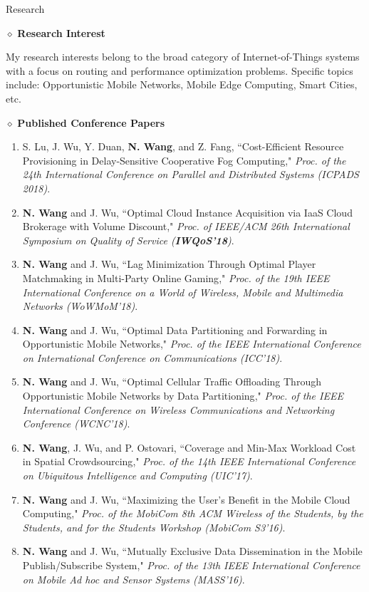 \documentclass{resume} %
\begin{document}
\begin{rSection}{Research}
\item $\diamond$ {\bf Research Interest}

My research interests belong to the broad category of Internet-of-Things systems with a focus on routing and performance optimization problems. Specific topics include: Opportunistic Mobile Networks, Mobile Edge Computing, Smart Cities, etc.

\item $\diamond$ {\bf Published Conference Papers}
\begin{enumerate}[{C}1.] \setlength{\itemsep}{-5pt}
\item S. Lu, J. Wu, Y. Duan, {\bf N. Wang}, and Z. Fang, ``Cost-Efficient Resource Provisioning in Delay-Sensitive Cooperative Fog Computing," \textit{Proc. of the 24th International Conference on Parallel and Distributed Systems (ICPADS 2018)}.
\item {\bf N. Wang} and J. Wu, ``{Optimal Cloud Instance Acquisition via IaaS Cloud Brokerage with Volume Discount}," \textit{Proc. of IEEE/ACM 26th International Symposium on Quality of Service ({\bf IWQoS'18})}.
\item {\bf N. Wang} and J. Wu, ``{Lag Minimization Through Optimal Player Matchmaking in Multi-Party Online Gaming}," \textit{Proc. of the 19th IEEE International Conference on a World of Wireless, Mobile and Multimedia Networks (WoWMoM'18)}.
\item {{\bf N. Wang} and J. Wu, ``{Optimal Data Partitioning and Forwarding in Opportunistic Mobile Networks},"} \textit{Proc. of the IEEE International Conference on International Conference on Communications (ICC'18)}.
\item {{\bf N. Wang} and J. Wu, ``{Optimal Cellular Traffic Offloading Through Opportunistic Mobile Networks by Data Partitioning},"} \textit{Proc. of the IEEE International Conference on Wireless Communications and Networking Conference (WCNC'18)}.
\item {{\bf N. Wang}, J. Wu, and P. Ostovari, ``{Coverage and Min-Max Workload Cost in Spatial Crowdsourcing},"} \textit{Proc. of the 14th IEEE International Conference on Ubiquitous Intelligence and Computing (UIC'17)}.
\item {{\bf N. Wang} and J. Wu, ``{Maximizing the User's Benefit in the Mobile Cloud Computing},"} \textit{Proc. of the MobiCom 8th ACM Wireless of the Students, by the Students, and for the Students Workshop (MobiCom S3'16)}.
\item {{\bf N. Wang} and J. Wu, ``{Mutually Exclusive Data Dissemination in the Mobile Publish/Subscribe System},"} \textit{Proc. of the 13th IEEE International Conference on Mobile Ad hoc and Sensor Systems (MASS'16)}.

\end{enumerate}
\end{rSection}
\end{document}
